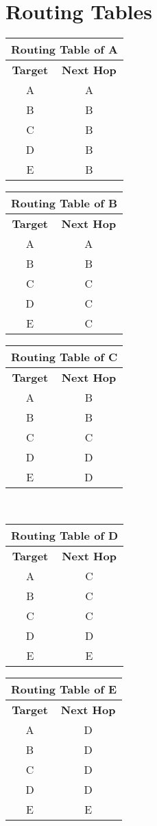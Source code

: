 \documentclass[12pt]{article}
\begin{document}
\section*{Routing Tables}
\begin{tabular}{|cc|}
\hline
\multicolumn{2}{|c|}{\textbf{Routing Table of A}}\\
\hline
\textbf{Target} & \textbf{Next Hop}\\
A & A \\
B & B \\
C & B \\
D & B \\
E & B \\
\hline
\end{tabular}
\begin{tabular}{|cc|}
\hline
\multicolumn{2}{|c|}{\textbf{Routing Table of B}}\\
\hline
\textbf{Target} & \textbf{Next Hop}\\
A & A \\
B & B \\
C & C \\
D & C \\
E & C \\
\hline
\end{tabular}
\begin{tabular}{|cc|}
\hline
\multicolumn{2}{|c|}{\textbf{Routing Table of C}}\\
\hline
\textbf{Target} & \textbf{Next Hop}\\
A & B \\
B & B \\
C & C \\
D & D \\
E & D \\
\hline
\end{tabular}
\\
\begin{tabular}{|cc|}
\hline
\multicolumn{2}{|c|}{\textbf{Routing Table of D}}\\
\hline
\textbf{Target} & \textbf{Next Hop}\\
A & C \\
B & C \\
C & C \\
D & D \\
E & E \\
\hline
\end{tabular}
\begin{tabular}{|cc|}
\hline
\multicolumn{2}{|c|}{\textbf{Routing Table of E}}\\
\hline
\textbf{Target} & \textbf{Next Hop}\\
A & D \\
B & D \\
C & D \\
D & D \\
E & E \\
\hline
\end{tabular}
\end{document}
